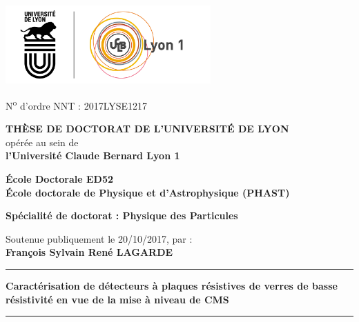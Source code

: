 	\fancyhf{}
	\setlength{\parindent}{0pt}
	\thispagestyle{empty}
	\begin{center}
		\includegraphics[height=3cm]{PG/logo.png} %
	\end{center}
	\vspace{-0.5cm}
	\fontsize{11pt}{13pt}\selectfont
	N\textsuperscript{o} d'ordre NNT : 2017LYSE1217
	
	\vspace{0.5cm}
	
	\begin{center}
		\fontsize{14pt}{16pt}\selectfont
		\textbf{\uppercase{Thèse de doctorat de l'université de Lyon}}\\
		\fontsize{12pt}{14pt}\selectfont
		opérée au sein de\\
		\textbf{l'Université Claude Bernard Lyon 1}
		
		\vspace{0.25cm}
		
		\textbf{École Doctorale ED52\\ École doctorale de Physique et d’Astrophysique (PHAST)}%
		
		\vspace{0.25cm}
		\textbf{Spécialité de doctorat : Physique des Particules}
		\vspace{0.25cm}
		
		Soutenue publiquement le 20/10/2017, par :\\
		\fontsize{14pt}{16pt}\selectfont
		\textbf{François Sylvain René LAGARDE}
	  
		\rule[20pt]{\textwidth}{0.5pt}
		\fontsize{23pt}{26pt}\selectfont
		\textbf{Caractérisation de détecteurs à plaques résistives de verres de basse résistivité en vue de la mise à niveau de CMS}
		\rule{\textwidth}{0.5pt}

	\end{center}
	
